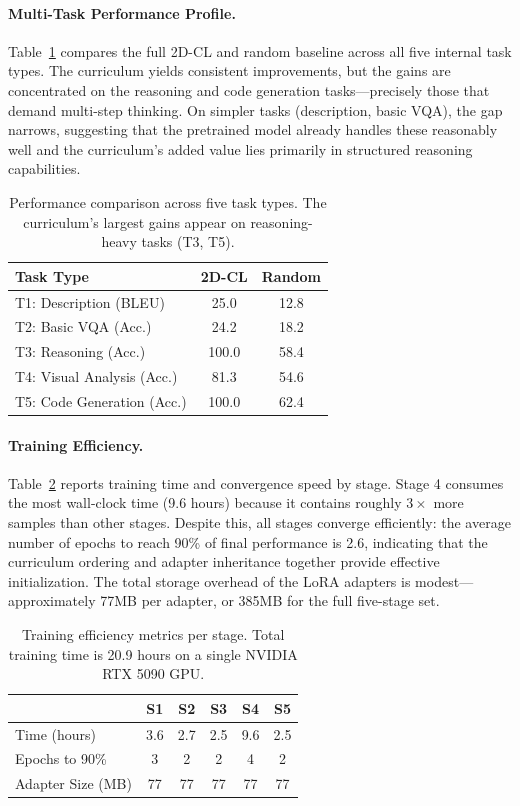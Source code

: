 \documentclass[journal]{IEEEtran}
\newcommand{\method}{2D-CL}
\begin{document}
\paragraph{Multi-Task Performance Profile.}
Table~\ref{tab:task_profile} compares the full \method{} and random baseline across all five internal task types. The curriculum yields consistent improvements, but the gains are concentrated on the reasoning and code generation tasks---precisely those that demand multi-step thinking. On simpler tasks (description, basic VQA), the gap narrows, suggesting that the pretrained model already handles these reasonably well and the curriculum's added value lies primarily in structured reasoning capabilities.

\begin{table}[!t]
\centering
\small
\begin{tabular}{lcc}
\toprule
\textbf{Task Type} & \textbf{\method{}} & \textbf{Random} \\
\midrule
T1: Description (BLEU) & 25.0 & 12.8 \\
T2: Basic VQA (Acc.) & 24.2 & 18.2 \\
T3: Reasoning (Acc.) & 100.0 & 58.4 \\
T4: Visual Analysis (Acc.) & 81.3 & 54.6 \\
T5: Code Generation (Acc.) & 100.0 & 62.4 \\
\bottomrule
\end{tabular}
\caption{Performance comparison across five task types. The curriculum's largest gains appear on reasoning-heavy tasks (T3, T5).}
\label{tab:task_profile}
\end{table}

\paragraph{Training Efficiency.}
Table~\ref{tab:efficiency} reports training time and convergence speed by stage. Stage 4 consumes the most wall-clock time (9.6 hours) because it contains roughly $3\times$ more samples than other stages. Despite this, all stages converge efficiently: the average number of epochs to reach 90\% of final performance is 2.6, indicating that the curriculum ordering and adapter inheritance together provide effective initialization. The total storage overhead of the LoRA adapters is modest---approximately 77MB per adapter, or 385MB for the full five-stage set.

\begin{table}[!t]
\centering
\small
\begin{tabular}{lccccc}
\toprule
& \textbf{S1} & \textbf{S2} & \textbf{S3} & \textbf{S4} & \textbf{S5} \\
\midrule
Time (hours) & 3.6 & 2.7 & 2.5 & 9.6 & 2.5 \\
Epochs to 90\% & 3 & 2 & 2 & 4 & 2 \\
Adapter Size (MB) & 77 & 77 & 77 & 77 & 77 \\
\bottomrule
\end{tabular}
\caption{Training efficiency metrics per stage. Total training time is 20.9 hours on a single NVIDIA RTX 5090 GPU.}
\label{tab:efficiency}
\end{table}



\end{document}
